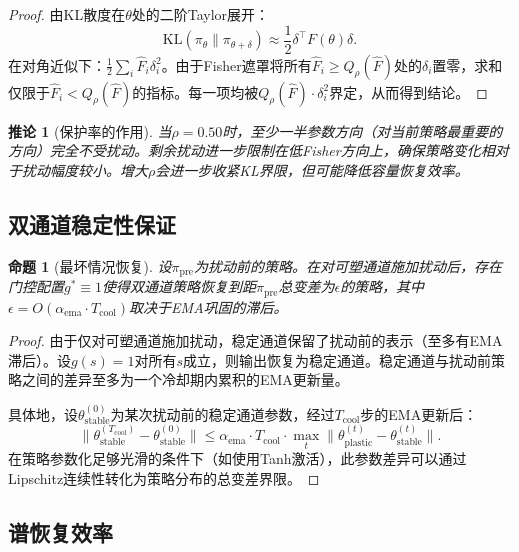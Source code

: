 \documentclass[twocolumn]{article}
\newtheorem{proposition}{\bf 命题}
\newtheorem{corollary}{\bf 推论}
\newcommand{\KL}{\mathrm{KL}}
\begin{document}
\begin{proof}
由KL散度在$\theta$处的二阶Taylor展开：
\begin{equation*}
\KL(\pi_\theta \| \pi_{\theta+\delta}) \approx \frac{1}{2} \delta^\top F(\theta) \delta.
\end{equation*}
在对角近似下：$\frac{1}{2} \sum_i \hat{F}_i \delta_i^2$。由于Fisher遮罩将所有$\hat{F}_i \geq Q_\rho(\hat{F})$处的$\delta_i$置零，求和仅限于$\hat{F}_i < Q_\rho(\hat{F})$的指标。每一项均被$Q_\rho(\hat{F}) \cdot \delta_i^2$界定，从而得到结论。
\end{proof}

\begin{corollary}[保护率的作用]
当$\rho = 0.50$时，至少一半参数方向（对当前策略最重要的方向）完全不受扰动。剩余扰动进一步限制在低Fisher方向上，确保策略变化相对于扰动幅度较小。增大$\rho$会进一步收紧KL界限，但可能降低容量恢复效率。
\end{corollary}


\subsection{双通道稳定性保证}

\begin{proposition}[最坏情况恢复]
\label{prop:stability}
设$\pi_{\text{pre}}$为扰动前的策略。在对可塑通道施加扰动后，存在门控配置$g^* \equiv 1$使得双通道策略恢复到距$\pi_{\text{pre}}$总变差为$\epsilon$的策略，其中$\epsilon = O(\alpha_{\text{ema}} \cdot T_{\text{cool}})$取决于EMA巩固的滞后。
\end{proposition}

\begin{proof}
由于仅对可塑通道施加扰动，稳定通道保留了扰动前的表示（至多有EMA滞后）。设$g(s) = 1$对所有$s$成立，则输出恢复为稳定通道。稳定通道与扰动前策略之间的差异至多为一个冷却期内累积的EMA更新量。

具体地，设$\theta_{\text{stable}}^{(0)}$为某次扰动前的稳定通道参数，经过$T_{\text{cool}}$步的EMA更新后：
\begin{equation*}
\|\theta_{\text{stable}}^{(T_{\text{cool}})} - \theta_{\text{stable}}^{(0)}\| \leq \alpha_{\text{ema}} \cdot T_{\text{cool}} \cdot \max_t \|\theta_{\text{plastic}}^{(t)} - \theta_{\text{stable}}^{(t)}\|.
\end{equation*}
在策略参数化足够光滑的条件下（如使用Tanh激活），此参数差异可以通过Lipschitz连续性转化为策略分布的总变差界限。
\end{proof}


\subsection{谱恢复效率}
\end{document}
